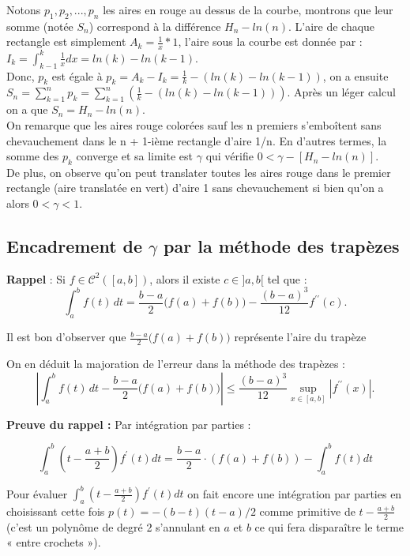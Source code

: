 \documentclass[a4paper,12pt]{article}
\begin{document}
Notons  \(p_1,p_2,...,p_n\)  les aires en rouge au dessus de la courbe, montrons que leur somme (notée \(S_n\)) correspond à la différence \(H_n - ln(n)\).
L'aire de chaque rectangle est simplement \(A_k = \frac{1}{x}*1\), l'aire sous la courbe est donnée par : \( I_k = \int_{k-1}^k \frac{1}{x} dx = ln(k)-ln(k-1) \).\\
Donc, \(p_k\) est égale à \(p_k = A_k - I_k = \frac{1}{k} - (ln(k)-ln(k-1))\), on a ensuite  \(S_n = \sum_{k=1}^n p_k= \sum_{k=1}^n (\frac{1}{k} - (ln(k)-ln(k-1)))\).
Après un léger calcul on a que \(S_n = H_n -ln(n) \).\\
On remarque que les aires rouge colorées sauf les n premiers s'emboîtent sans chevauchement dans le n + 1-ième rectangle d'aire 1/n. En d'autres termes, la somme des \(p_k\) converge et sa limite est \(\gamma\)  qui vérifie \(0 < \gamma-[H_n -ln(n)] \).\\
De plus, on observe qu'on peut translater toutes les aires rouge  dans le premier rectangle (aire translatée en vert) d'aire 1 sans chevauchement si bien qu'on a alors \(0<\gamma<1\). 


\subsection{Encadrement de $\gamma$ par la méthode des trapèzes}

\textbf{Rappel } : Si \( f \in \mathscr{C}^{2}([a,b]) \), alors il existe \( c \in ]a,b[ \) tel que :
\[
\int_{a}^{b} f(t)\,dt = \frac{b-a}{2} \big(f(a) + f(b)\big) - \frac{(b-a)^3}{12} f^{\prime\prime}(c).
\]

Il est bon d'observer que \( \frac{b-a}{2} \big(f(a) + f(b)\big) \) représente l'aire du trapèze

On en déduit la majoration de l'erreur dans la méthode des trapèzes :
\[
\left| \int_{a}^{b} f(t)\,dt - \frac{b-a}{2} \big(f(a) + f(b)\big) \right| \leq \frac{(b-a)^3}{12} \sup_{x \in [a,b]} |f^{\prime\prime}(x)|.
\]

\textbf{Preuve du rappel : } Par intégration par parties :

\[
\int_{a}^{b}\left(t-\frac{a+b}{2}\right)f^{\prime}(t)dt = \frac{b-a}{2}\cdot(f(a)+ f(b)) - \int_{a}^{b}f(t)dt
\]

Pour évaluer $\int_{a}^{b}\left(t-\frac{a+b}{2}\right)f^{\prime}(t)dt$ on fait encore une intégration par parties en choisissant cette fois $p(t)=-(b-t)(t-a)/2$ comme primitive de $t-\frac{a+b}{2}$ (c'est un polynôme de degré 2 s'annulant en $a$ et $b$ ce qui fera disparaître le terme « entre crochets »).
\end{document}
